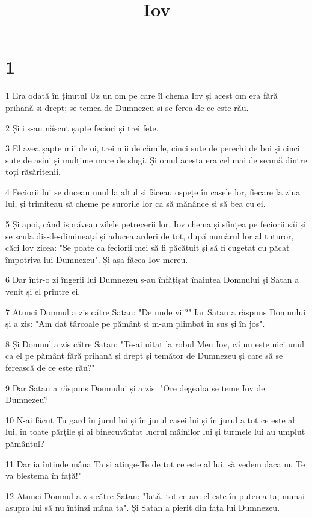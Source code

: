 

\title{Iov}


\chapter{1}

\par 1 Era odată în ținutul Uz un om pe care îl chema Iov și acest om era fără prihană și drept; se temea de Dumnezeu și se ferea de ce este rău.
\par 2 Și i s-au născut șapte feciori și trei fete.
\par 3 El avea șapte mii de oi, trei mii de cămile, cinci sute de perechi de boi și cinci sute de asini și mulțime mare de slugi. Și omul acesta era cel mai de seamă dintre toți răsăritenii.
\par 4 Feciorii lui se duceau unul la altul și făceau ospețe în casele lor, fiecare la ziua lui, și trimiteau să cheme pe surorile lor ca să mănânce și să bea cu ei.
\par 5 Și apoi, când isprăveau zilele petrecerii lor, Iov chema și sfințea pe feciorii săi și se scula dis-de-dimineață și aducea arderi de tot, după numărul lor al tuturor, căci Iov zicea: "Se poate ca feciorii mei să fi păcătuit și să fi cugetat cu păcat împotriva lui Dumnezeu". Și așa făcea Iov mereu.
\par 6 Dar într-o zi îngerii lui Dumnezeu s-au înfățișat înaintea Domnului și Satan a venit și el printre ei.
\par 7 Atunci Domnul a zis către Satan: "De unde vii?" Iar Satan a răspuns Domnului și a zis: "Am dat târcoale pe pământ și m-am plimbat în sus și în jos".
\par 8 Și Domnul a zis către Satan: "Te-ai uitat la robul Meu Iov, că nu este nici unul ca el pe pământ fără prihană și drept și temător de Dumnezeu și care să se ferească de ce este rău?"
\par 9 Dar Satan a răspuns Domnului și a zis: "Ore degeaba se teme Iov de Dumnezeu?
\par 10 N-ai făcut Tu gard în jurul lui și în jurul casei lui și în jurul a tot ce este al lui, în toate părțile și ai binecuvântat lucrul mâinilor lui și turmele lui au umplut pământul?
\par 11 Dar ia întinde mâna Ta și atinge-Te de tot ce este al lui, să vedem dacă nu Te va blestema în față!"
\par 12 Atunci Domnul a zis către Satan: "Iată, tot ce are el este în puterea ta; numai asupra lui să nu întinzi mâna ta". Și Satan a pierit din fața lui Dumnezeu.
